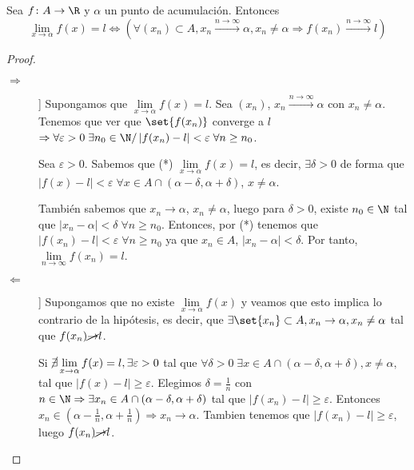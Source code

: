 \begin{proposition}
	\label{caractsuc}
	Sea \(f \colon A \to \R \) y \(\alpha\) un punto de acumulación. Entonces
	\[
		\lim\limits_{x  \to \alpha} f(x) = l \iff (\forall (x_n) \subset A, x_n \overset{n \rightarrow \infty}{\longrightarrow} \alpha, x_n \neq \alpha \Rightarrow f(x_n) \overset{n\rightarrow \infty}{\longrightarrow} l)
	\]
\end{proposition}
\begin{proof}
	\begin{description}
		\item[\(\Rightarrow \)]] Supongamos que \(\lim\limits_{x  \to \alpha} f(x) = l  \). Sea \((x_n )\), \(x_n \overset{n \rightarrow \infty}{\longrightarrow} \alpha \) con \(x_n \neq \alpha\). Tenemos que ver que \(\set{f(x_n )}\) converge a \(l \) \(\Rightarrow \forall \varepsilon > 0 \; \exists n_0 \in \N / \left\vert f(x_n) - l \right\vert < \varepsilon \; \forall n \geq n_0 \).
		
		Sea \(\varepsilon > 0 \). Sabemos que (*) \(\lim\limits_{x  \to \alpha} f(x) = l \), es decir, \(\exists \delta > 0 \) de forma que \(\left\vert f(x) - l  \right\vert < \varepsilon \; \forall x \in A \cap (\alpha - \delta, \alpha + \delta)\), \(x \neq \alpha\).
		
		También sabemos que \(x_n \rightarrow \alpha\), \(x_n \neq \alpha\), luego para \(\delta > 0 \), existe \(n_0 \in \N \) tal que \(\left\vert x_n - \alpha \right\vert < \delta \; \forall n \geq n_0\). Entonces, por (*) tenemos que \(\left\vert f(x_n) - l  \right\vert < \varepsilon \; \forall n \geq n_0\) ya que \(x_n \in A \), \(\left\vert x_n - \alpha \right\vert < \delta\). Por tanto, \(\lim\limits_{n  \to \infty} f(x_n) = l\). 
		
		\item[\(\Leftarrow \)]] Supongamos que no existe \(\lim\limits_{x \to \alpha} f(x)\) y veamos que esto implica lo contrario de la hipótesis, es decir, que \(\exists \set{x_n } \subset A, x_n \rightarrow \alpha, x_n \neq \alpha\) tal que \(f(x_n) \cancel \rightarrow l \).
		
		Si \(\cancel \exists \lim\limits_{x  \to \alpha} f(x) = l , \exists \varepsilon > 0  \) tal que \(\forall \delta > 0 \; \exists x \in A \cap (\alpha - \delta, \alpha + \delta), x \neq \alpha,\) tal que \(\left\vert f(x) - l \right\vert \geq \varepsilon\). Elegimos \(\delta = \frac{1}{n }\) con \(n \in \N  \Rightarrow \exists x_n \in A \cap (\alpha - \delta, \alpha + \delta)\) tal que \(\left\vert f(x_n) - l  \right\vert \geq \varepsilon\). Entonces \(x_n \in (\alpha - \frac{1}{n}, \alpha + \frac{1}{n}) \Rightarrow x_n \rightarrow \alpha\). Tambien tenemos que \(\left\vert f(x_n) - l  \right\vert \geq \varepsilon\), luego \(f(x_n) \cancel \rightarrow l \).
	\end{description}
\end{proof}

